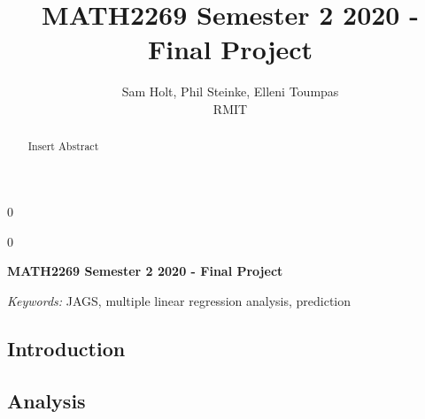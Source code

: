 \documentclass[12pt]{article}
\newcommand{\blind}{0}
\begin{document}
\def\spacingset#1{\renewcommand{\baselinestretch}%
{#1}\small\normalsize} \spacingset{1}



\blind
{
  \title{\bf MATH2269 Semester 2 2020 - Final Project}

  \author{
        Sam Holt, Phil Steinke, Elleni Toumpas \\
    RMIT\\
      }
  \maketitle
} \fi

\blind
{
  \bigskip
  \bigskip
  \bigskip
  \begin{center}
    {\LARGE\bf MATH2269 Semester 2 2020 - Final Project}
  \end{center}
  \medskip
} \fi

\bigskip
\begin{abstract}
Insert Abstract
\end{abstract}

\noindent%
{\it Keywords:} JAGS, multiple linear regression analysis, prediction
\vfill

\newpage
\spacingset{1.45} %

\hypertarget{introduction}{%
\subsection{Introduction}\label{introduction}}

\hypertarget{analysis}{%
\subsection{Analysis}\label{analysis}}
\end{document}
